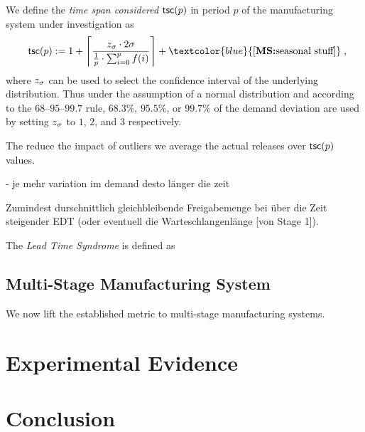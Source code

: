 \documentclass[mnsc]{informs3}
\DeclarePairedDelimiter{\ceil}{\lceil}{\rceil}
\newcommand\MS[2][r]{\ifx t#1 \textcolor{blue}{[\textbf{MS:} #2]}
  \else \begin{center}\textcolor{blue}{\textbf{MS:} #2} \end{center} \fi}
\begin{document}
\begin{definition}
  We define the \emph{time span considered} $\mathsf{tsc}(p)$ in period $p$ of the manufacturing system
  under investigation as
  \begin{align*}
    \tsc{p} \defsym 1 + \ceil[\Bigg]{\frac{ \zs \cdot 2 \sigma}{\frac{1}{p} \cdot \sum_{i=0}^{p}{f(i)}}} +
    \MS[t]{\text{seasonal stuff}} \tcom
  \end{align*}
  where $z_{\sigma}$ can be used to select the confidence interval of the underlying distribution. Thus
  under the assumption of a normal distribution and according to the $68$--$95$--$99.7$ rule,
  $68.3\%$, $95.5\%$, or $99.7\%$ of the demand deviation are used by setting $z_{\sigma}$ to $1$, $2$, and
  $3$ respectively.

\end{definition}


The reduce the impact of outliers we average the actual releases over $\mathsf{tsc}(p)$ values.


- je mehr variation im demand desto länger die zeit


Zumindest durschnittlich gleichbleibende Freigabemenge bei über die Zeit steigender EDT (oder
eventuell die Warteschlangenlänge [von Stage 1]).


\begin{definition}
  The \emph{Lead Time Syndrome} is defined as
\end{definition}



\subsection{Multi-Stage Manufacturing System}
\label{subsec:Multi-Stage_Manufacturing_System}


We now lift the established metric to multi-stage manufacturing systems.


\section{Experimental Evidence}
\label{sec:Experimental_Evidence}


\section{Conclusion}
\label{sec:Conclusion}




\end{document}
